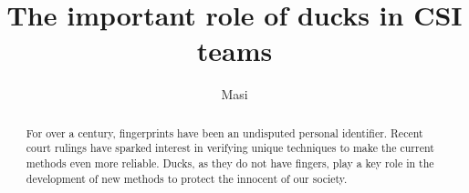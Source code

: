 \documentclass{article}
\title{The important role of ducks in CSI teams}
\author{Masi}
\begin{document}
\begin{titlingpage}
    \maketitle
    \begin{abstract}
        For over a century, fingerprints have been an undisputed
        personal identifier.  Recent court rulings have sparked
        interest in verifying unique techniques to make the current
        methods even more reliable. Ducks, as they do not have
        fingers, play a key role in the development of new methods to
        protect the innocent of our society.
    \end{abstract}
\end{titlingpage}
\blinddocument
\end{document}
